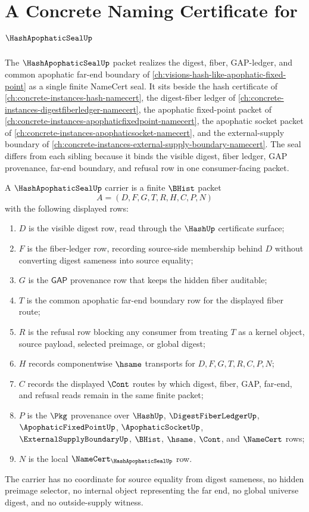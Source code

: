 \chapter{A Concrete Naming Certificate for $\HashApophaticSealUp$}
\label{ch:concrete-instances-hashapophaticseal-namecert}

The $\HashApophaticSealUp$ packet realizes the digest, fiber, GAP-ledger, and common apophatic far-end boundary of \autoref{ch:visions-hash-like-apophatic-fixed-point} as a single finite NameCert seal. It sits beside the hash certificate of \autoref{ch:concrete-instances-hash-namecert}, the digest-fiber ledger of \autoref{ch:concrete-instances-digestfiberledger-namecert}, the apophatic fixed-point packet of \autoref{ch:concrete-instances-apophaticfixedpoint-namecert}, the apophatic socket packet of \autoref{ch:concrete-instances-apophaticsocket-namecert}, and the external-supply boundary of \autoref{ch:concrete-instances-external-supply-boundary-namecert}. The seal differs from each sibling because it binds the visible digest, fiber ledger, GAP provenance, far-end boundary, and refusal row in one consumer-facing packet.

\begin{definition}
\label{def:hash-apophatic-seal-carrier}
A $\HashApophaticSealUp$ carrier is a finite $\BHist$ packet
$$
A=(D,F,G,T,R,H,C,P,N)
$$
with the following displayed rows:
\begin{enumerate}
\item $D$ is the visible digest row, read through the $\HashUp$ certificate surface;
\item $F$ is the fiber-ledger row, recording source-side membership behind $D$ without converting digest sameness into source equality;
\item $G$ is the $\mathsf{GAP}$ provenance row that keeps the hidden fiber auditable;
\item $T$ is the common apophatic far-end boundary row for the displayed fiber route;
\item $R$ is the refusal row blocking any consumer from treating $T$ as a kernel object, source payload, selected preimage, or global digest;
\item $H$ records componentwise $\hsame$ transports for $D,F,G,T,R,C,P,N$;
\item $C$ records the displayed $\Cont$ routes by which digest, fiber, GAP, far-end, and refusal reads remain in the same finite packet;
\item $P$ is the $\Pkg$ provenance over $\HashUp$, $\DigestFiberLedgerUp$, $\ApophaticFixedPointUp$, $\ApophaticSocketUp$, $\ExternalSupplyBoundaryUp$, $\BHist$, $\hsame$, $\Cont$, and $\NameCert$ rows;
\item $N$ is the local $\NameCert_{\HashApophaticSealUp}$ row.
\end{enumerate}
The carrier has no coordinate for source equality from digest sameness, no hidden preimage selector, no internal object representing the far end, no global universe digest, and no outside-supply witness.
\end{definition}

